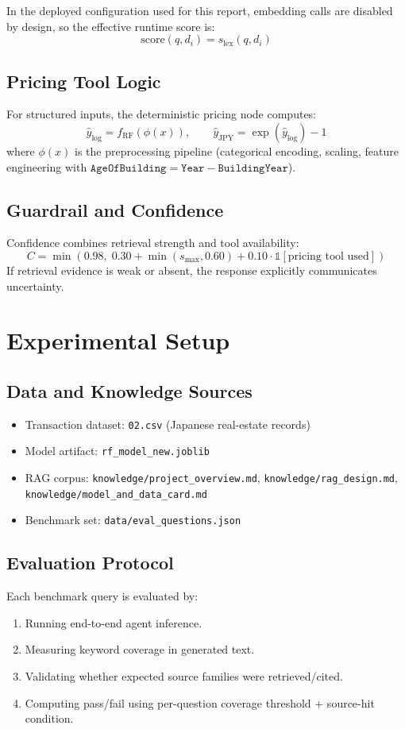 \documentclass[12pt,a4paper]{article}
\begin{document}
In the deployed configuration used for this report, embedding calls are disabled by design, so the effective runtime score is:
\[
\text{score}(q,d_i) = s_{\text{lex}}(q,d_i)
\]

\subsection{Pricing Tool Logic}
For structured inputs, the deterministic pricing node computes:
\[
\hat{y}_{\log} = f_{\text{RF}}(\phi(x)), \qquad
\hat{y}_{\text{JPY}} = \exp(\hat{y}_{\log}) - 1
\]
where $\phi(x)$ is the preprocessing pipeline (categorical encoding, scaling, feature engineering with $\texttt{AgeOfBuilding} = \texttt{Year} - \texttt{BuildingYear}$).

\subsection{Guardrail and Confidence}
Confidence combines retrieval strength and tool availability:
\[
C = \min\left(0.98,\;0.30 + \min(s_{\max},0.60) + 0.10\cdot\mathbb{1}[\text{pricing tool used}]\right)
\]
If retrieval evidence is weak or absent, the response explicitly communicates uncertainty.

\section{Experimental Setup}
\subsection{Data and Knowledge Sources}
\begin{itemize}[leftmargin=1.6em]
  \item Transaction dataset: \texttt{02.csv} (Japanese real-estate records)
  \item Model artifact: \texttt{rf\_model\_new.joblib}
  \item RAG corpus: \texttt{knowledge/project\_overview.md}, \texttt{knowledge/rag\_design.md}, \texttt{knowledge/model\_and\_data\_card.md}
  \item Benchmark set: \texttt{data/eval\_questions.json}
\end{itemize}

\subsection{Evaluation Protocol}
Each benchmark query is evaluated by:
\begin{enumerate}[leftmargin=1.8em]
  \item Running end-to-end agent inference.
  \item Measuring keyword coverage in generated text.
  \item Validating whether expected source families were retrieved/cited.
  \item Computing pass/fail using per-question coverage threshold + source-hit condition.
\end{enumerate}
\end{document}
